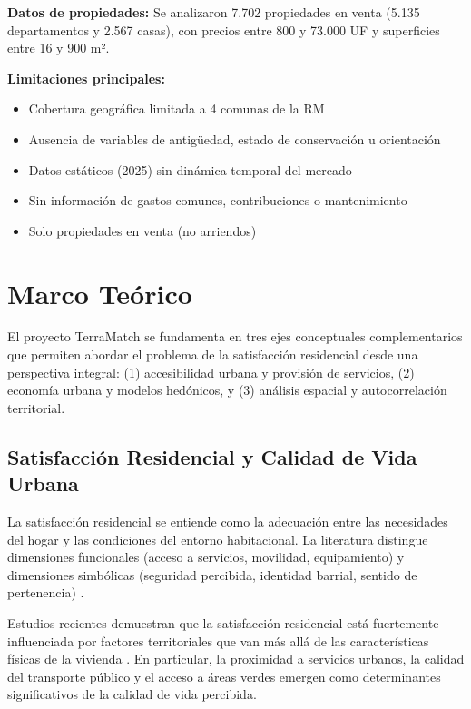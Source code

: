 \documentclass[11pt,letterpaper]{article}
\begin{document}
\textbf{Datos de propiedades:} Se analizaron 7.702 propiedades en venta (5.135 departamentos y 2.567 casas), con precios entre 800 y 73.000 UF y superficies entre 16 y 900 m².

\textbf{Limitaciones principales:}
\begin{itemize}
    \item Cobertura geográfica limitada a 4 comunas de la RM
    \item Ausencia de variables de antigüedad, estado de conservación u orientación
    \item Datos estáticos (2025) sin dinámica temporal del mercado
    \item Sin información de gastos comunes, contribuciones o mantenimiento
    \item Solo propiedades en venta (no arriendos)
\end{itemize}

\newpage
\section{Marco Teórico}

El proyecto TerraMatch se fundamenta en tres ejes conceptuales complementarios que permiten abordar el problema de la satisfacción residencial desde una perspectiva integral: (1) accesibilidad urbana y provisión de servicios, (2) economía urbana y modelos hedónicos, y (3) análisis espacial y autocorrelación territorial.

\subsection{Satisfacción Residencial y Calidad de Vida Urbana}

La satisfacción residencial se entiende como la adecuación entre las necesidades del hogar y las condiciones del entorno habitacional. La literatura distingue dimensiones funcionales (acceso a servicios, movilidad, equipamiento) y dimensiones simbólicas (seguridad percibida, identidad barrial, sentido de pertenencia) \cite{marans2015,bonaiuto2015}.

Estudios recientes demuestran que la satisfacción residencial está fuertemente influenciada por factores territoriales que van más allá de las características físicas de la vivienda \cite{park2020}. En particular, la proximidad a servicios urbanos, la calidad del transporte público y el acceso a áreas verdes emergen como determinantes significativos de la calidad de vida percibida.
\end{document}
